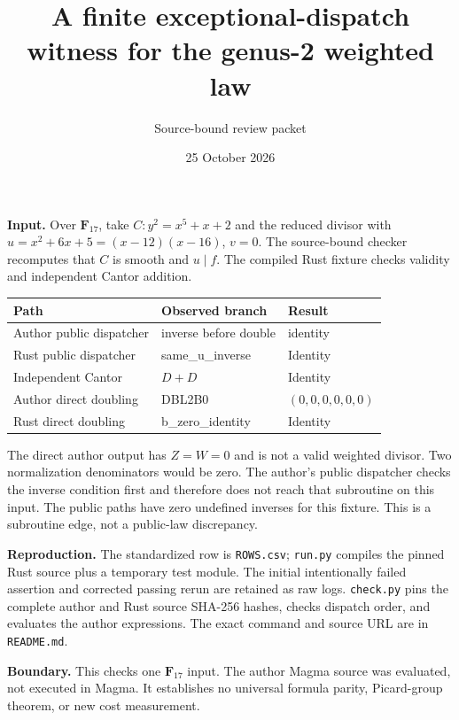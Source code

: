 \documentclass[11pt]{article}
\begin{document}
\title{A finite exceptional-dispatch witness for the genus-2 weighted law}
\author{Source-bound review packet}
\date{25 October 2026}
\maketitle

\noindent\textbf{Input.} Over $\mathbf F_{17}$, take
$C:y^2=x^5+x+2$ and the reduced divisor with
$u=x^2+6x+5=(x-12)(x-16)$, $v=0$.
The source-bound checker recomputes that $C$ is smooth and $u\mid f$.
The compiled Rust fixture checks validity and independent Cantor addition.

\begin{center}
\begin{tabular}{lll}
Path & Observed branch & Result\\\hline
Author public dispatcher & inverse before double & identity\\
Rust public dispatcher & same\_u\_inverse & Identity\\
Independent Cantor & $D+D$ & Identity\\
Author direct doubling & DBL2B0 & $(0,0,0,0,0,0)$\\
Rust direct doubling & b\_zero\_identity & Identity\\
\end{tabular}
\end{center}

\noindent The direct author output has $Z=W=0$ and is not a valid weighted
divisor. Two normalization denominators would be zero. The author's public
dispatcher checks the inverse condition first and therefore does not reach
that subroutine on this input. The public paths have zero undefined inverses
for this fixture. This is a subroutine edge, not a public-law discrepancy.

\noindent\textbf{Reproduction.} The standardized row is \texttt{ROWS.csv};
\texttt{run.py} compiles the pinned Rust source plus a temporary test module.
The initial intentionally failed assertion and corrected passing rerun are
retained as raw logs. \texttt{check.py} pins the complete author and Rust source
SHA-256 hashes, checks dispatch order, and evaluates the author expressions.
The exact command and source URL are in \texttt{README.md}.

\noindent\textbf{Boundary.} This checks one $\mathbf F_{17}$ input. The
author Magma source was evaluated, not executed in Magma. It establishes no
universal formula parity, Picard-group theorem, or new cost measurement.
\end{document}
